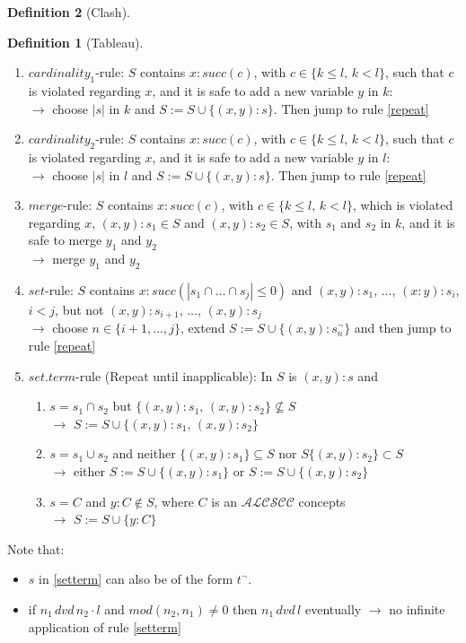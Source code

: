 \documentclass[a4paper,11pt]{scrartcl}
\theoremstyle{break}
\theoremstyle{definition}
\newtheorem{mydef}{Definition}
\begin{document}
\begin{mydef}[Clash]
\begin{mydef}[Tableau]
\begin{enumerate}
\item\label{setterm}$cardinality_1$-rule: $S$ contains $x:succ(c)$, with $c\in\{k\leq l,\,k<l\}$, such that $c$ is violated regarding $x$, and it is safe to add a new variable $y$ in $k$:\\
$\rightarrow$ choose $|s|$ in $k$ and $S:=S\cup\{(x,y):s\}$. Then jump to rule \ref{repeat}
\item\label{setterm2}$cardinality_2$-rule: $S$ contains $x:succ(c)$, with $c\in\{k\leq l,\,k<l\}$, such that $c$ is violated regarding $x$, and it is safe to add a new variable $y$ in $l$:\\
$\rightarrow$ choose $|s|$ in $l$ and $S:=S\cup\{(x,y):s\}$. Then jump to rule \ref{repeat}
\item\label{exceeded}$merge$-rule: $S$ contains $x:succ(c)$, with $c\in\{k\leq l,\,k<l\}$, which is violated regarding $x$, $(x,y):s_1\in S$ and $(x,y):s_2\in S$, with $s_1$ and $s_2$ in $k$, and it is safe to merge $y_1$ and $y_2$\\
$\rightarrow$ merge $y_1$ and $y_2$ 
\item\label{s}$set$-rule: $S$ contains $x:succ(|s_1\cap\dots\cap s_j|\leq 0)$ and $(x,y):s_1$, $\dots$, $(x:y):s_i$, $i<j$, but not $(x,y):s_{i+1}$, $\dots$, $(x,y):s_j$\\
$\rightarrow$ choose $n\in\{i+1,\dots, j\}$, extend $S:=S\cup\{(x,y):s_n^\neg\}$ and then jump to rule \ref{repeat}
\item\label{repeat} $set.term$-rule (Repeat until inapplicable): In $S$ is $(x,y):s$ and
\begin{enumerate}
\item\label{setterm1} $s=s_1\cap s_2$ but $\{(x,y):s_1,\,(x,y):s_2\}\not\subseteq S$\\
$\rightarrow$ $S:=S\cup \{(x,y):s_1,\,(x,y):s_2\}$ 
\item\label{setterm2} $s=s_1\cup s_2$ and neither $\{(x,y):s_1\}\subseteq S$ nor $S\{(x,y):s_2\}\subset S$\\
$\rightarrow$ either $S:=S\cup \{(x,y):s_1\}$ or $S:=S\cup \{(x,y):s_2\}$ 
\item\label{setterm3} $s=C$ and $y:C\notin S$, where $C$ is an $\mathcal{ALCSCC}$ concepts\\
$\rightarrow$ $S:=S\cup\{y:C\}$
\end{enumerate}
\end{enumerate}
\end{mydef}
Note that:
\begin{itemize}
\item $s$ in \ref{setterm} can also be of the form $t^\neg$.
\item if  $n_1\,dvd\,n_2\cdot l$ and $mod(n_2,n_1)\neq 0$ then $n_1\,dvd\,l$ eventually $\rightarrow$ no infinite application of rule \ref{setterm}
\end{itemize}
\end{mydef}
\end{document}
